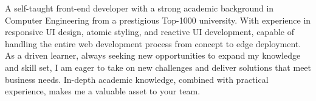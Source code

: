
\begin{cvparagraph}
A self-taught front-end developer with a strong academic background in Computer Engineering
 from a prestigious Top-1000 university.
With experience in responsive UI design, atomic styling, and reactive UI development,
 capable of handling the entire web development process from concept to edge deployment.
\newline
As a driven learner, always seeking new opportunities to expand my knowledge and skill set,
 I am eager to take on new challenges and deliver solutions that meet business needs.
 In-depth academic knowledge, combined with practical experience, makes me a valuable asset to your team.
\end{cvparagraph}
